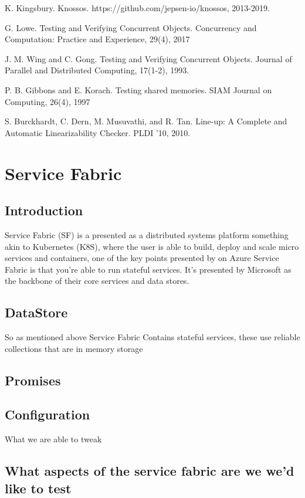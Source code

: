 \documentclass[a4paper,10pt,titlepage]{report}
\begin{document}
K. Kingsbury. Knossos.
https://github.com/jepsen-io/knossos, 2013-2019.

G. Lowe. Testing and Verifying Concurrent Objects.
Concurrency and Computation: Practice and
Experience, 29(4), 2017

J. M. Wing and C. Gong. Testing and Verifying
Concurrent Objects. Journal of Parallel and
Distributed Computing, 17(1-2), 1993.

P. B. Gibbons and E. Korach. Testing shared
memories. SIAM Journal on Computing, 26(4), 1997

S. Burckhardt, C. Dern, M. Musuvathi, and R. Tan.
Line-up: A Complete and Automatic Linearizability
Checker. PLDI ’10, 2010.


\section{Service Fabric}

\subsection{Introduction}

Service Fabric (SF) is a presented as a distributed systems platform something akin to Kubernetes (K8S), where the user is able to build, deploy and scale micro services and containers, one of the key points presented by on Azure Service Fabric is that you're able to run stateful services. It's presented by Microsoft as the backbone of their core services and data stores.


\subsection{DataStore}

So as mentioned above Service Fabric Contains stateful services, these use reliable collections that are in memory storage 



\subsection{Promises}


\subsection{Configuration}


What we are able to tweak


\subsection{What aspects of the service fabric are we  we'd like to test}
\end{document}
